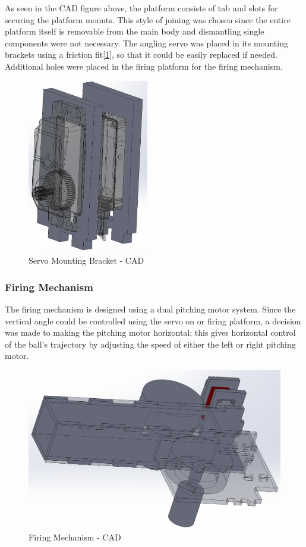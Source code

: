 \documentclass{article}
\begin{document}
As seen in the CAD figure above, the platform consists of tab and slots  for securing the platform mounts. This style of joining was chosen  since the entire platform itself is removable from the main body and dismantling single components were not necessary. The angling servo was placed in its mounting brackets using a friction fit[\ref{fig:ServoMountCAD}], so that it could be easily replaced if needed. Additional holes were placed in the firing platform for the firing mechanism.

\begin{figure}[H]
    \centering
    \includegraphics[height = 3in]{ServoMountCAD.PNG}
    \caption{Servo Mounting Bracket - CAD}
    \label{fig:ServoMountCAD}
\end{figure}

\subsubsection{Firing Mechanism}
The firing mechanism is designed using a dual pitching motor system. Since the vertical angle could be controlled using the servo on or firing platform, a decision was made to making the pitching motor horizontal; this gives horizontal control of the ball's trajectory by adjusting the speed of either the left or right pitching motor.


\begin{figure}[H]
    \centering
    \includegraphics[width = 5in]{FiringMechanismCAD.PNG}
    \caption{Firing Mechanism - CAD}
    \label{fig:FiringMechanismCAD}
\end{figure}
\end{document}
